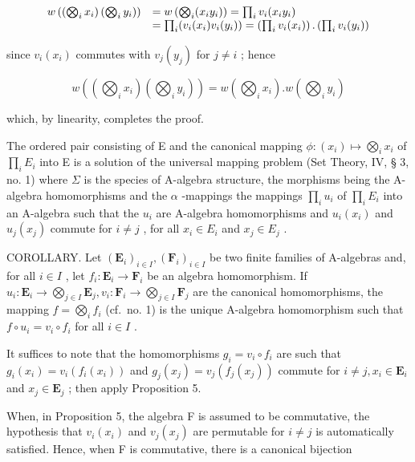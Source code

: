 \[
\begin{array}{r l} w \left(\left(\bigotimes_ {i} x _ {i}\right) \left(\bigotimes_ {i} y _ {i}\right)\right) & = w \left(\bigotimes_ {i} (x _ {i} y _ {i})\right) = \prod_ {i} v _ {i} (x _ {i} y _ {i}) \\ & = \prod_ {i} (v _ {i} (x _ {i}) v _ {i} (y _ {i})) = \left(\prod_ {i} v _ {i} (x _ {i})\right). \left(\prod_ {i} v _ {i} (y _ {i})\right) \end{array}
\]

since \(v_{i}(x_{i})\) commutes with \(v_{j}(y_{j})\) for \(j \neq i\) ; hence

\[
w \left(\left(\bigotimes_ {i} x _ {i}\right) \left(\bigotimes_ {i} y _ {i}\right)\right) = w \left(\bigotimes_ {i} x _ {i}\right). w \left(\bigotimes_ {i} y _ {i}\right)
\]

which, by linearity, completes the proof.

The ordered pair consisting of E and the canonical mapping \(\phi: (x_i) \mapsto \bigotimes_i x_i\) of \(\prod_i E_i\) into E is a solution of the universal mapping problem (Set Theory, IV, § 3, no. 1) where \(\Sigma\) is the species of A-algebra structure, the morphisms being the A-algebra homomorphisms and the \(\alpha\) -mappings the mappings \(\prod_i u_i\) of \(\prod_i E_i\) into an A-algebra such that the \(u_i\) are A-algebra homomorphisms and \(u_i(x_i)\) and \(u_j(x_j)\) commute for \(i \neq j\) , for all \(x_i \in E_i\) and \(x_j \in E_j\) .

COROLLARY. Let \((\mathbf{E}_i)_{i\in I}, (\mathbf{F}_i)_{i\in I}\) be two finite families of A-algebras and, for all \(i\in I\) , let \(f_i: \mathbf{E}_i \to \mathbf{F}_i\) be an algebra homomorphism. If \(u_i: \mathbf{E}_i \to \bigotimes_{j\in I} \mathbf{E}_{j}, v_i: \mathbf{F}_i \to \bigotimes_{j\in I} \mathbf{F}_j\) are the canonical homomorphisms, the mapping \(f = \bigotimes_{i} f_i\) (cf.~no. 1) is the unique A-algebra homomorphism such that \(f \circ u_i = v_i \circ f_i\) for all \(i\in I\) .

It suffices to note that the homomorphisms \(g_{i} = v_{i} \circ f_{i}\) are such that \(g_{i}(x_{i}) = v_{i}(f_{i}(x_{i}))\) and \(g_{j}(x_{j}) = v_{j}(f_{j}(x_{j}))\) commute for \(i \neq j, x_{i} \in \mathbf{E}_{i}\) and \(x_{j} \in \mathbf{E}_{j}\) ; then apply Proposition 5.

When, in Proposition 5, the algebra F is assumed to be commutative, the hypothesis that \(v_{i}(x_{i})\) and \(v_{j}(x_{j})\) are permutable for \(i \neq j\) is automatically satisfied. Hence, when F is commutative, there is a canonical bijection

